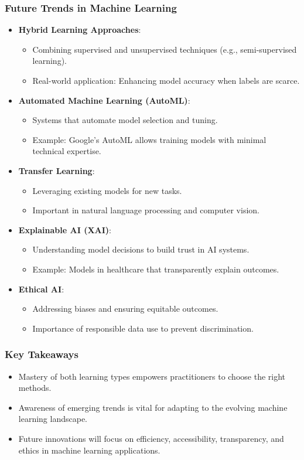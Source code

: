\documentclass{beamer}
\begin{document}
\begin{frame}[fragile]
    \frametitle{Future Trends in Machine Learning}
    \begin{itemize}
        \item \textbf{Hybrid Learning Approaches}:
        \begin{itemize}
            \item Combining supervised and unsupervised techniques (e.g., semi-supervised learning).
            \item Real-world application: Enhancing model accuracy when labels are scarce.
        \end{itemize}
        \item \textbf{Automated Machine Learning (AutoML)}:
        \begin{itemize}
            \item Systems that automate model selection and tuning.
            \item Example: Google's AutoML allows training models with minimal technical expertise.
        \end{itemize}
        \item \textbf{Transfer Learning}:
        \begin{itemize}
            \item Leveraging existing models for new tasks.
            \item Important in natural language processing and computer vision.
        \end{itemize}
        \item \textbf{Explainable AI (XAI)}:
        \begin{itemize}
            \item Understanding model decisions to build trust in AI systems.
            \item Example: Models in healthcare that transparently explain outcomes.
        \end{itemize}
        \item \textbf{Ethical AI}:
        \begin{itemize}
            \item Addressing biases and ensuring equitable outcomes.
            \item Importance of responsible data use to prevent discrimination.
        \end{itemize}
    \end{itemize}
\end{frame}

\begin{frame}[fragile]
    \frametitle{Key Takeaways}
    \begin{itemize}
        \item Mastery of both learning types empowers practitioners to choose the right methods.
        \item Awareness of emerging trends is vital for adapting to the evolving machine learning landscape.
        \item Future innovations will focus on efficiency, accessibility, transparency, and ethics in machine learning applications.
    \end{itemize}
\end{frame}
\end{document}

